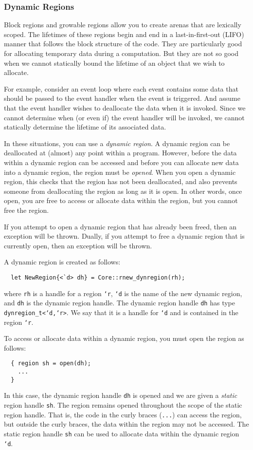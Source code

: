 \subsubsection*{Dynamic Regions}

Block regions and growable regions allow you to create arenas that
are lexically scoped.  The lifetimes of these regions begin and end
in a last-in-first-out (LIFO) manner that follows the block structure
of the code.  They are particularly good for allocating temporary
data during a computation.  But they are not so good when we cannot
statically bound the lifetime of an object that we wish to allocate.

For example, consider an event loop where each event contains some
data that should be passed to the event handler when the event is
triggered.  And assume that the event handler wishes to deallocate
the data when it is invoked.  Since we cannot determine when (or even
if) the event handler will be invoked, we cannot statically determine
the lifetime of its associated data.

In these situations, you can use a \emph{dynamic region}.  A dynamic
region can be deallocated at (almost) any point within a program.
However, before the data within a dynamic region can be accessed
and before you can allocate new data into a dynamic region, the
region must be \emph{opened}.  When you open a dynamic region, this
checks that the region has not been deallocated, and also prevents
someone from deallocating the region as long as it is open.  In
other words, once open, you are free to access or allocate data 
within the region, but you cannot free the region.  

If you attempt to open a dynamic region that has already been freed, then
an exception will be thrown.  Dually, if you attempt to free a
dynamic region that is currently open, then an exception will be
thrown.  

A dynamic region is created as follows:
\begin{verbatim}
  let NewRegion{<`d> dh} = Core::rnew_dynregion(rh);
\end{verbatim}
where \texttt{rh} is a handle for a region \texttt{`r}, \texttt{`d} is
the name of the new dynamic region, and \texttt{dh} is the dynamic region handle.
The dynamic region handle \texttt{dh} has type \texttt{dynregion_t<`d,`r>}.
We say that it is a handle for \texttt{`d} and is contained in the
region \texttt{`r}.

To access or allocate data within a dynamic region, you must
open the region as follows:
\begin{verbatim}
  { region sh = open(dh);
    ...
  }
\end{verbatim}
In this case, the dynamic region handle \texttt{dh} is opened and we
are given a \emph{static} region handle \texttt{sh}.  The region
remains opened throughout the scope of the static region handle.
That is, the code in the curly braces (\texttt{...}) can access
the region, but outside the curly braces, the data within the
region may not be accessed.  The static region
handle \texttt{sh} can be used to allocate data within the dynamic 
region \texttt{`d}.

